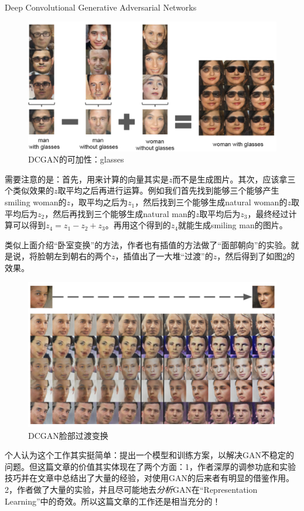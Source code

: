 \documentclass{ctexart}
\begin{document}
\begin{section}{Deep Convolutional Generative Adversarial Networks}
		\begin{figure}
			\centering
			\includegraphics[width=35em]{figures/DCGAN-visualizing-internals-vector-2.PNG}
			\caption{DCGAN的可加性：glasses}
			\label{fig:dcgan-vector-glasses}
		\end{figure}
		
		需要注意的是：首先，用来计算的向量其实是$z$而不是生成图片。其次，应该拿三个类似效果的$z$取平均之后再进行运算。例如我们首先找到能够三个能够产生smiling woman的$z$，取平均之后为$z_1$，然后找到三个能够生成natural woman的$z$取平均后为$z_2$，然后再找到三个能够生成natural man的$z$取平均后为$z_3$，最终经过计算可以得到$z_4=z_1-z_2+z_3$。再用这个得到的$z_4$就能生成smiling man的图片。
		
		类似上面介绍“卧室变换”的方法，作者也有插值的方法做了“面部朝向”的实验。就是说，将脸朝左到朝右的两个$z$，插值出了一大堆“过渡”的$z$，然后得到了如图\ref{fig:dcgan-vector-trans}的效果。
		
		\begin{figure}
			\centering
			\includegraphics[width=35em]{figures/DCGAN-visualizing-internals-vector-4.png}
			\caption{DCGAN脸部过渡变换}
			\label{fig:dcgan-vector-trans}
		\end{figure}
	
		个人认为这个工作其实挺简单：提出一个模型和训练方案，以解决GAN不稳定的问题。但这篇文章的价值其实体现在了两个方面：1，作者深厚的调参功底和实验技巧并在文章中总结出了大量的经验，对使用GAN的后来者有明显的借鉴作用。2，作者做了大量的实验，并且尽可能地去\emph{分析}GAN在“Representation Learning”中的奇效。所以这篇文章的工作还是相当充分的！
		
	\end{section}
\end{document}
